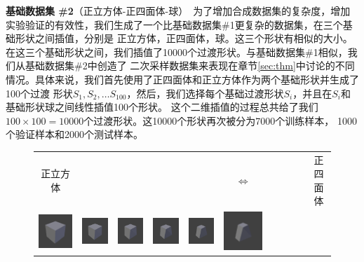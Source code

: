 \documentclass[bachelor, nocolorlinks, printoneside]{seuthesis} %
\begin{document}
\begin{Main}
\textbf{基础数据集 \#2}（正立方体-正四面体-球）~为了增加合成数据集的复杂度，增加实验验证的有效性，我们生成了一个比基础数据集\#1更复杂的数据集，在三个基础形状之间插值，分别是
正立方体，正四面体，球。这三个形状有相似的大小。在这三个基础形状之间，我们插值了10000个过渡形状。与基础数据集\#1相似，我们从基础数据集\#2中创造了
二次采样数据集来表现在章节\ref{sec:thm}中讨论的不同情况。具体来说，我们首先使用了正四面体和正立方体作为两个基础形状并生成了100个过渡
形状$S_1,S_2,\ldots S_{100}$，然后，我们选择每个基础过渡形状$S_i$，并且在$S_i$和基础形状球之间线性插值100个形状。
这个二维插值的过程总共给了我们$100 \times 100 = 10000$个过渡形状。这10000个形状再次被分为7000个训练样本，
1000个验证样本和2000个测试样本。 

\begin{figure}
	\begin{tabular}{c@{}c@{}c@{}c@{}c@{}c@{}c@{}c@{}c@{}c@{}c@{}}
	    正立方体   & & & & & $\Longleftrightarrow$ & & & & & 正四面体 \\
		\includegraphics[width=.09\textwidth,keepaspectratio]{figs/triangle/cube_triangle/Isometric_0.png} &
		\includegraphics[width=.09\textwidth,keepaspectratio]{figs/triangle/cube_triangle/Isometric_1.png} &
		\includegraphics[width=.09\textwidth,keepaspectratio]{figs/triangle/cube_triangle/Isometric_2.png} &
		\includegraphics[width=.09\textwidth,keepaspectratio]{figs/triangle/cube_triangle/Isometric_3.png} &
		\includegraphics[width=.09\textwidth,keepaspectratio]{figs/triangle/cube_triangle/Isometric_4.png} &
		\includegraphics[width=.09\textwidth,keepaspectratio]{figs/triangle/cube_triangle/Isometric_5.png} &

\end{tabular}
\end{figure}
\end{Main}
\end{document}
